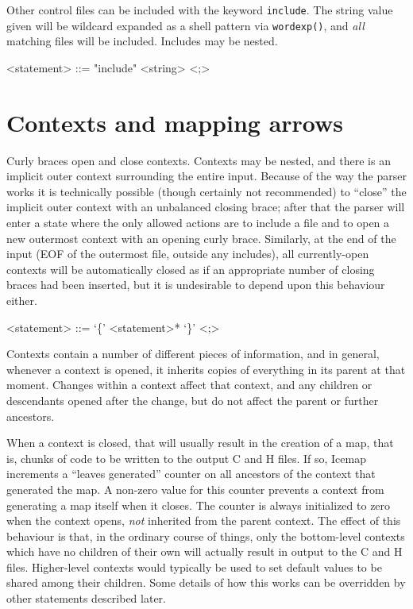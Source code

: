 \documentclass{mitsuba}
\begin{document}
Other control files can be included with the
keyword \verb|include|.  The string value given will be wildcard expanded as
a shell pattern via \verb|wordexp()|, and \emph{all} matching files will be
included.  Includes may be nested.

\begin{grammar}
<statement> ::= "include" <string> <;>
\end{grammar}

\section{Contexts and mapping arrows}

Curly braces open and close contexts.
Contexts may be nested, and there is an implicit outer context surrounding
the entire input.  Because of the way the parser works it is technically
possible (though certainly not recommended) to ``close'' the implicit outer
context with an unbalanced closing brace; after that the parser will enter a
state where the only allowed actions are to include a file and to open a new
outermost context with an opening curly brace.  Similarly, at the end of the
input (EOF of the outermost file, outside any includes), all currently-open
contexts will be automatically closed as if an appropriate number of closing
braces had been inserted, but it is undesirable to depend upon this
behaviour either.

\begin{grammar}
<statement> ::= `\{' <statement>* `\}' <;>
\end{grammar}

Contexts contain a number of different pieces of
information, and in general, whenever a context is opened, it inherits
copies of everything in its parent at that moment.  Changes within a context
affect that context, and any children or descendants opened after the
change, but do not affect the parent or further ancestors.

When a context is closed, that will usually result in the creation of a map,
that is, chunks of code to be written to the output C and H files.  If so,
Icemap increments a ``leaves generated'' counter on
all ancestors of the context that generated the map.  A non-zero value for
this counter prevents a context from generating a map itself when it closes. 
The counter is always initialized to zero when the context opens, \emph{not}
inherited from the parent context.  The effect of this behaviour is that, in
the ordinary course of things, only the bottom-level contexts which have no
children of their own will actually result in output to the C and H files. 
Higher-level contexts would typically be used to set default values to be
shared among their children.  Some details of how this works can be
overridden by other statements described later.
\end{document}
